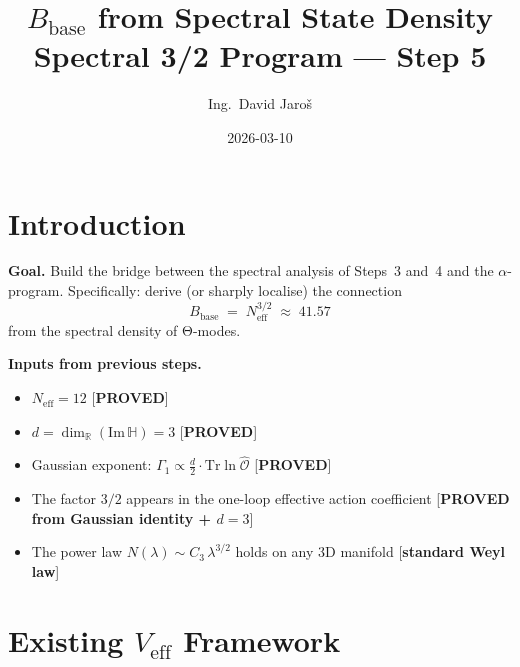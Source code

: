 \documentclass[11pt,a4paper]{article}
\title{$B_{\mathrm{base}}$ from Spectral State Density\\
    \large Spectral 3/2 Program — Step 5}
\author{Ing.\ David Jaroš}
\date{2026-03-10}
\theoremstyle{definition}
\theoremstyle{remark}
\begin{document}
  \maketitle
\fi

\section{Introduction}
\label{sec:intro}

\textbf{Goal.}
Build the bridge between the spectral analysis of Steps~3 and~4
and the $\alpha$-program.
Specifically: derive (or sharply localise) the connection
\begin{equation}
  B_{\mathrm{base}} \;=\; N_{\mathrm{eff}}^{3/2} \;\approx\; 41.57
  \label{eq:B_target}
\end{equation}
from the spectral density of Θ-modes.

\textbf{Inputs from previous steps.}
\begin{itemize}
  \item $N_{\mathrm{eff}} = 12$ [\textbf{PROVED}]
  \item $d = \dim_\mathbb{R}(\mathrm{Im}\,\mathbb{H}) = 3$ [\textbf{PROVED}]
  \item Gaussian exponent: $\Gamma_1 \propto \frac{d}{2} \cdot \mathrm{Tr}\ln\hat{\mathcal{O}}$
    [\textbf{PROVED}]
  \item The factor $3/2$ appears in the one-loop effective action coefficient
    [\textbf{PROVED from Gaussian identity + $d=3$}]
  \item The power law $N(\lambda) \sim C_3\,\lambda^{3/2}$ holds on
    any 3D manifold [\textbf{standard Weyl law}]
\end{itemize}

\section{Existing $V_{\mathrm{eff}}$ Framework}
\label{sec:Veff}
\end{document}
